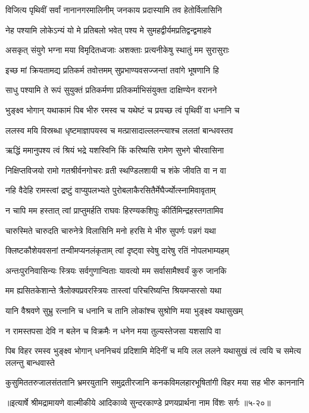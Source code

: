 \twolineshloka
{विजित्य पृथिवीं सर्वां नानानगरमालिनीम्}
{जनकाय प्रदास्यामि तव हेतोर्विलासिनि} %

\twolineshloka
{नेह पश्यामि लोकेऽन्यं यो मे प्रतिबलो भवेत्}
{पश्य मे सुमहद्वीर्यमप्रतिद्वन्द्वमाहवे} %

\twolineshloka
{असकृत् संयुगे भग्ना मया विमृदितध्वजाः}
{अशक्ताः प्रत्यनीकेषु स्थातुं मम सुरासुराः} %

\twolineshloka
{इच्छ मां क्रियतामद्य प्रतिकर्म तवोत्तमम्}
{सुप्रभाण्यवसज्जन्तां तवांगे भूषणानि हि} %

\twolineshloka
{साधु पश्यामि ते रूपं सुयुक्तं प्रतिकर्मणा}
{प्रतिकर्माभिसंयुक्ता दाक्षिण्येन वरानने} %

\twolineshloka
{भुङ्क्ष्व भोगान् यथाकामं पिब भीरु रमस्व च}
{यथेष्टं च प्रयच्छ त्वं पृथिवीं वा धनानि च} %

\twolineshloka
{ललस्व मयि विस्रब्धा धृष्टमाज्ञापयस्व च}
{मत्प्रासादाल्ललन्त्याश्च ललतां बान्धवस्तव} %

\twolineshloka
{ऋद्धिं ममानुपश्य त्वं श्रियं भद्रे यशस्विनि}
{किं करिष्यसि रामेण सुभगे चीरवासिना} %

\twolineshloka
{निक्षिप्तविजयो रामो गतश्रीर्वनगोचरः}
{व्रती स्थण्डिलशायी च शंके जीवति वा न वा} %

\twolineshloka
{नहि वैदेहि रामस्त्वां द्रष्टुं वाप्युपलभ्यते}
{पुरोबलाकैरसितैर्मेघैर्ज्योत्स्नामिवावृताम्} %

\twolineshloka
{न चापि मम हस्तात् त्वां प्राप्तुमर्हति राघवः}
{हिरण्यकशिपुः कीर्तिमिन्द्रहस्तगतामिव} %

\twolineshloka
{चारुस्मिते चारुदति चारुनेत्रे विलासिनि}
{मनो हरसि मे भीरु सुपर्णः पन्नगं यथा} %

\twolineshloka
{क्लिष्टकौशेयवसनां तन्वीमप्यनलंकृताम्}
{त्वां दृष्ट्वा स्वेषु दारेषु रतिं नोपलभाम्यहम्} %

\twolineshloka
{अन्तःपुरनिवासिन्यः स्त्रियः सर्वगुणान्विताः}
{यावत्यो मम सर्वासामैश्वर्यं कुरु जानकि} %

\twolineshloka
{मम ह्यसितकेशान्ते त्रैलोक्यप्रवरस्त्रियः}
{तास्त्वां परिचरिष्यन्ति श्रियमप्सरसो यथा} %

\twolineshloka
{यानि वैश्रवणे सुभ्रु रत्नानि च धनानि च}
{तानि लोकांश्च सुश्रोणि मया भुङ्क्ष्व यथासुखम्} %

\twolineshloka
{न रामस्तपसा देवि न बलेन च विक्रमैः}
{न धनेन मया तुल्यस्तेजसा यशसापि वा} %

\twolineshloka
{पिब विहर रमस्व भुङ्क्ष्व भोगान् धननिचयं प्रदिशामि मेदिनीं च}
{मयि लल ललने यथासुखं त्वं त्वयि च समेत्य ललन्तु बान्धवास्ते} %

\twolineshloka
{कुसुमिततरुजालसंततानि भ्रमरयुतानि समुद्रतीरजानि}
{कनकविमलहारभूषितांगी विहर मया सह भीरु काननानि} %


॥इत्यार्षे श्रीमद्रामायणे वाल्मीकीये आदिकाव्ये सुन्दरकाण्डे प्रणयप्रार्थना नाम विंशः सर्गः ॥५-२०॥
